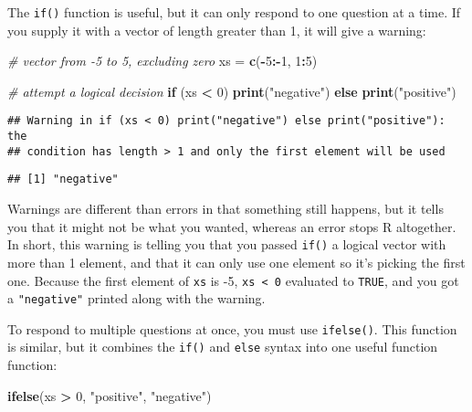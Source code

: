 \documentclass[]{book}
\newenvironment{Shaded}{\begin{snugshade}}{\end{snugshade}}
\newcommand{\KeywordTok}[1]{\textcolor[rgb]{0.13,0.29,0.53}{\textbf{#1}}}
\newcommand{\DecValTok}[1]{\textcolor[rgb]{0.00,0.00,0.81}{#1}}
\newcommand{\StringTok}[1]{\textcolor[rgb]{0.31,0.60,0.02}{#1}}
\newcommand{\CommentTok}[1]{\textcolor[rgb]{0.56,0.35,0.01}{\textit{#1}}}
\newcommand{\ControlFlowTok}[1]{\textcolor[rgb]{0.13,0.29,0.53}{\textbf{#1}}}
\newcommand{\OperatorTok}[1]{\textcolor[rgb]{0.81,0.36,0.00}{\textbf{#1}}}
\newcommand{\NormalTok}[1]{#1}
\theoremstyle{definition}
\theoremstyle{definition}
\theoremstyle{definition}
\theoremstyle{remark}
\begin{document}
The \texttt{if()} function is useful, but it can only respond to one
question at a time. If you supply it with a vector of length greater
than 1, it will give a warning:

\begin{Shaded}
\begin{Highlighting}[]
\CommentTok{# vector from -5 to 5, excluding zero}
\NormalTok{xs =}\StringTok{ }\KeywordTok{c}\NormalTok{(}\OperatorTok{-}\DecValTok{5}\OperatorTok{:-}\DecValTok{1}\NormalTok{, }\DecValTok{1}\OperatorTok{:}\DecValTok{5}\NormalTok{)}

\CommentTok{# attempt a logical decision}
\ControlFlowTok{if}\NormalTok{ (xs }\OperatorTok{<}\StringTok{ }\DecValTok{0}\NormalTok{) }\KeywordTok{print}\NormalTok{(}\StringTok{"negative"}\NormalTok{) }\ControlFlowTok{else} \KeywordTok{print}\NormalTok{(}\StringTok{"positive"}\NormalTok{)}
\end{Highlighting}
\end{Shaded}

\begin{verbatim}
## Warning in if (xs < 0) print("negative") else print("positive"): the
## condition has length > 1 and only the first element will be used
\end{verbatim}

\begin{verbatim}
## [1] "negative"
\end{verbatim}

Warnings are different than errors in that something still happens, but
it tells you that it might not be what you wanted, whereas an error
stops R altogether. In short, this warning is telling you that you
passed \texttt{if()} a logical vector with more than 1 element, and that
it can only use one element so it's picking the first one. Because the
first element of \texttt{xs} is -5, \texttt{xs\ \textless{}\ 0}
evaluated to \texttt{TRUE}, and you got a \texttt{"negative"} printed
along with the warning.

To respond to multiple questions at once, you must use
\texttt{ifelse()}. This function is similar, but it combines the
\texttt{if()} and \texttt{else} syntax into one useful function
function:

\begin{Shaded}
\begin{Highlighting}[]
\KeywordTok{ifelse}\NormalTok{(xs }\OperatorTok{>}\StringTok{ }\DecValTok{0}\NormalTok{, }\StringTok{"positive"}\NormalTok{, }\StringTok{"negative"}\NormalTok{)}
\end{Highlighting}
\end{Shaded}
\end{document}
